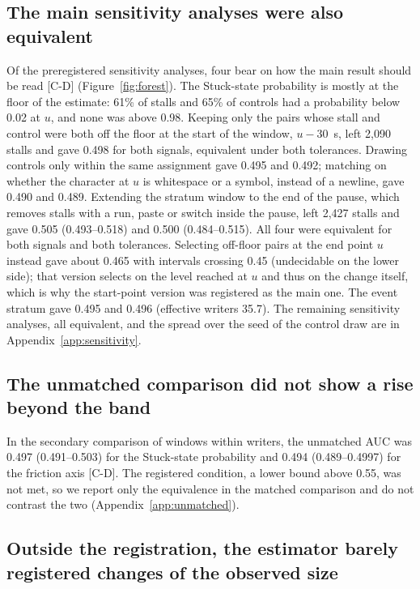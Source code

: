 \subsection{The main sensitivity analyses were also equivalent}
\label{sec:res-sens}

Of the preregistered sensitivity analyses, four bear on how the main result should be read [C-D]
(Figure~\ref{fig:forest}). The Stuck-state probability is mostly at the floor of the estimate: 61\% of stalls and 65\%
of controls had a probability below 0.02 at $u$, and none was above 0.98. Keeping only the pairs whose stall and control were both off the floor
at the start of the window, $u - 30$~s, left 2,090 stalls and gave 0.498 for both signals, equivalent under both
tolerances. Drawing controls only within the same assignment gave 0.495 and 0.492; matching on whether the character at
$u$ is whitespace or a symbol, instead of a newline, gave 0.490 and 0.489. Extending the stratum window to the end of
the pause, which removes stalls with a run, paste or switch inside the pause, left 2,427 stalls and gave 0.505
(0.493--0.518) and 0.500 (0.484--0.515). All four were equivalent for both signals and both tolerances. Selecting
off-floor pairs at the end point $u$ instead gave about 0.465 with intervals crossing 0.45 (undecidable on the lower
side); that version selects on the level reached at $u$ and thus on the change itself, which is why the start-point
version was registered as the main one. The event stratum gave 0.495 and 0.496 (effective writers 35.7). The remaining
sensitivity analyses, all equivalent, and the spread over the seed of the control draw are in
Appendix~\ref{app:sensitivity}.

\subsection{The unmatched comparison did not show a rise beyond the band}

In the secondary comparison of windows within writers, the unmatched AUC was 0.497 (0.491--0.503) for the Stuck-state
probability and 0.494 (0.489--0.4997) for the friction axis [C-D]. The registered condition, a lower bound above 0.55,
was not met, so we report only the equivalence in the matched comparison and do not contrast the two
(Appendix~\ref{app:unmatched}).

\subsection{Outside the registration, the estimator barely registered changes of the observed size}
\label{sec:res-bounds}

